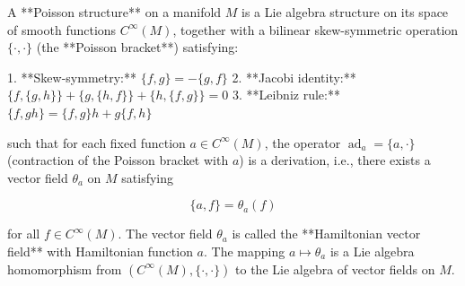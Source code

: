 A **Poisson structure** on a manifold $M$ is a Lie algebra structure on its space of smooth functions $C^\infty(M)$, together with a bilinear skew-symmetric operation $\{\cdot, \cdot\}$ (the **Poisson bracket**) satisfying:

1. **Skew-symmetry:** $\{f, g\} = -\{g, f\}$
2. **Jacobi identity:** $\{f, \{g, h\}\} + \{g, \{h, f\}\} + \{h, \{f, g\}\} = 0$
3. **Leibniz rule:** $\{f, gh\} = \{f, g\}h + g\{f, h\}$

such that for each fixed function $a \in C^\infty(M)$, the operator $\operatorname{ad}_a = \{a, \cdot\}$ (contraction of the Poisson bracket with $a$) is a derivation, i.e., there exists a vector field $\theta_a$ on $M$ satisfying

$$\{a, f\} = \theta_a(f)$$

for all $f \in C^\infty(M)$. The vector field $\theta_a$ is called the **Hamiltonian vector field** with Hamiltonian function $a$. The mapping $a \mapsto \theta_a$ is a Lie algebra homomorphism from $(C^\infty(M), \{\cdot,\cdot\})$ to the Lie algebra of vector fields on $M$.
